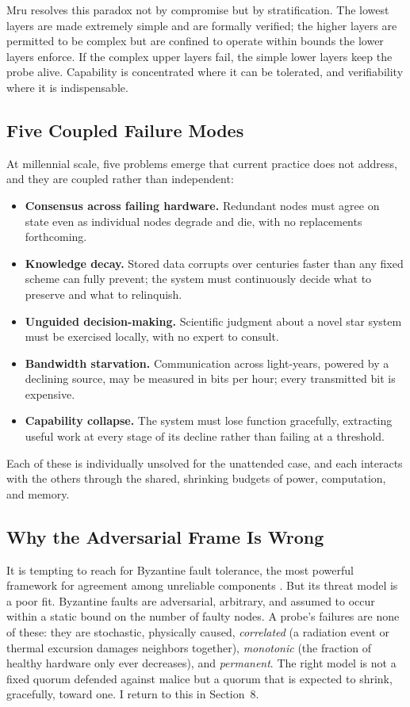 \documentclass[10pt, a4paper]{article}
\begin{document}
Mru resolves this paradox not by compromise but by stratification. The lowest layers are made extremely simple and are formally verified; the higher layers are permitted to be complex but are confined to operate within bounds the lower layers enforce. If the complex upper layers fail, the simple lower layers keep the probe alive. Capability is concentrated where it can be tolerated, and verifiability where it is indispensable.

\subsection{Five Coupled Failure Modes}

At millennial scale, five problems emerge that current practice does not address, and they are coupled rather than independent:

\begin{itemize}
\setlength{\itemsep}{2pt}
\item \textbf{Consensus across failing hardware.} Redundant nodes must agree on state even as individual nodes degrade and die, with no replacements forthcoming.
\item \textbf{Knowledge decay.} Stored data corrupts over centuries faster than any fixed scheme can fully prevent; the system must continuously decide what to preserve and what to relinquish.
\item \textbf{Unguided decision-making.} Scientific judgment about a novel star system must be exercised locally, with no expert to consult.
\item \textbf{Bandwidth starvation.} Communication across light-years, powered by a declining source, may be measured in bits per hour; every transmitted bit is expensive.
\item \textbf{Capability collapse.} The system must lose function gracefully, extracting useful work at every stage of its decline rather than failing at a threshold.
\end{itemize}

Each of these is individually unsolved for the unattended case, and each interacts with the others through the shared, shrinking budgets of power, computation, and memory.

\subsection{Why the Adversarial Frame Is Wrong}

It is tempting to reach for Byzantine fault tolerance, the most powerful framework for agreement among unreliable components \cite{lamport1982}. But its threat model is a poor fit. Byzantine faults are adversarial, arbitrary, and assumed to occur within a static bound on the number of faulty nodes. A probe's failures are none of these: they are stochastic, physically caused, \textit{correlated} (a radiation event or thermal excursion damages neighbors together), \textit{monotonic} (the fraction of healthy hardware only ever decreases), and \textit{permanent}. The right model is not a fixed quorum defended against malice but a quorum that is expected to shrink, gracefully, toward one. I return to this in Section~8.
\end{document}
